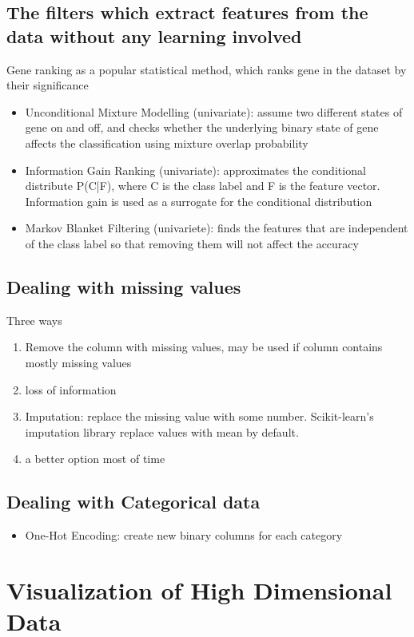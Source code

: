 \documentclass[11pt]{article}
\begin{document}
\subsection{The filters which extract features from the data without any learning involved}
\label{sec:org330101b}
Gene ranking as a popular statistical method, which ranks gene in the dataset by their significance
\begin{itemize}
\item Unconditional Mixture Modelling (univariate): assume two different states of gene on and off, and checks whether the underlying binary state of gene affects the classification using mixture overlap probability
\item Information Gain Ranking (univariate): approximates the conditional distribute P(C|F), where C is the class label and F is the feature vector. Information gain is used as a surrogate for the conditional distribution
\item Markov Blanket Filtering (univariete): finds the features that are independent of the class label so that removing them will not affect the accuracy
\end{itemize}
\subsection{Dealing with missing values}
\label{sec:org77a35ab}
Three ways 
\begin{enumerate}
\item Remove the column with missing values, may be used if column contains mostly missing values
\item loss of information
\item Imputation: replace the missing value with some number. Scikit-learn's imputation library replace values with mean by default.
\item a better option most of time
\end{enumerate}
\subsection{Dealing with Categorical data}
\label{sec:org8784723}
\begin{itemize}
\item One-Hot Encoding: create new binary columns for each category
\end{itemize}

\section{Visualization of High Dimensional Data}
\label{sec:org74fc431}
\end{document}
